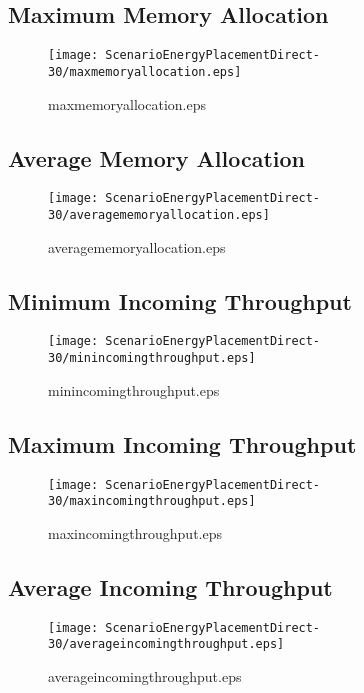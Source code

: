 \documentclass{elsart}
\begin{document}
\clearpage
\subsection{Maximum Memory Allocation}

\begin{figure}[ht]
\centering
\texttt{[image: ScenarioEnergyPlacementDirect-30/maxmemoryallocation.eps]}
\caption{maxmemoryallocation.eps}\label{fig:maxmemoryallocation}
\end{figure}

\clearpage
\subsection{Average Memory Allocation}

\begin{figure}[ht]
\centering
\texttt{[image: ScenarioEnergyPlacementDirect-30/averagememoryallocation.eps]}
\caption{averagememoryallocation.eps}\label{fig:averagememoryallocation}
\end{figure}

\clearpage
\subsection{Minimum Incoming Throughput}

\begin{figure}[ht]
\centering
\texttt{[image: ScenarioEnergyPlacementDirect-30/minincomingthroughput.eps]}
\caption{minincomingthroughput.eps}\label{fig:minincomingthroughput}
\end{figure}

\clearpage
\subsection{Maximum Incoming Throughput}

\begin{figure}[ht]
\centering
\texttt{[image: ScenarioEnergyPlacementDirect-30/maxincomingthroughput.eps]}
\caption{maxincomingthroughput.eps}\label{fig:maxincomingthroughput}
\end{figure}

\clearpage
\subsection{Average Incoming Throughput}

\begin{figure}[ht]
\centering
\texttt{[image: ScenarioEnergyPlacementDirect-30/averageincomingthroughput.eps]}
\caption{averageincomingthroughput.eps}\label{fig:averageincomingthroughput}
\end{figure}
\end{document}

